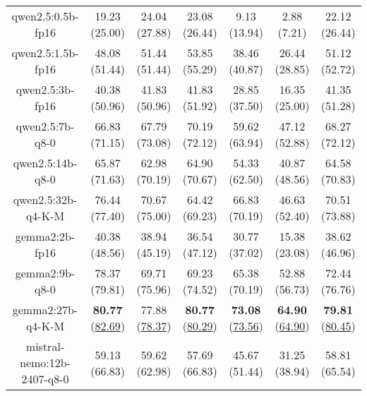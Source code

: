 \begin{table}[hbp]
{\begin{tabular}{ccccccc}
      \multicolumn{1}{c|}{qwen2.5:0.5b-fp16} & 19.23 (25.00) & 24.04 (27.88) & \multicolumn{1}{c|}{23.08 (26.44)} & 9.13 (13.94) & \multicolumn{1}{c|}{2.88 (7.21)} & 22.12 (26.44) \\

      \multicolumn{1}{c|}{qwen2.5:1.5b-fp16} & 48.08 (51.44) & 51.44 (51.44) & \multicolumn{1}{c|}{53.85 (55.29)} & 38.46 (40.87) & \multicolumn{1}{c|}{26.44 (28.85)} & 51.12 (52.72) \\

      \multicolumn{1}{c|}{qwen2.5:3b-fp16} & 40.38 (50.96) & 41.83 (50.96) & \multicolumn{1}{c|}{41.83 (51.92)} & 28.85 (37.50) & \multicolumn{1}{c|}{16.35 (25.00)} & 41.35 (51.28) \\

      \multicolumn{1}{c|}{qwen2.5:7b-q8-0} & 66.83 (71.15) & 67.79 (73.08) & \multicolumn{1}{c|}{70.19 (72.12)} & 59.62 (63.94) & \multicolumn{1}{c|}{47.12 (52.88)} & 68.27 (72.12) \\

      \multicolumn{1}{c|}{qwen2.5:14b-q8-0} & 65.87 (71.63) & 62.98 (70.19) & \multicolumn{1}{c|}{64.90 (70.67)} & 54.33 (62.50) & \multicolumn{1}{c|}{40.87 (48.56)} & 64.58 (70.83) \\

      \multicolumn{1}{c|}{qwen2.5:32b-q4-K-M} & 76.44 (77.40) & 70.67 (75.00) & \multicolumn{1}{c|}{64.42 (69.23)} & 66.83 (70.19) & \multicolumn{1}{c|}{46.63 (52.40)} & 70.51 (73.88) \\

      \multicolumn{1}{c|}{gemma2:2b-fp16} & 40.38 (48.56) & 38.94 (45.19) & \multicolumn{1}{c|}{36.54 (47.12)} & 30.77 (37.02) & \multicolumn{1}{c|}{15.38 (23.08)} & 38.62 (46.96) \\

      \multicolumn{1}{c|}{gemma2:9b-q8-0} & 78.37 (79.81) & 69.71 (75.96) & \multicolumn{1}{c|}{69.23 (74.52)} & 65.38 (70.19) & \multicolumn{1}{c|}{52.88 (56.73)} & 72.44 (76.76) \\

      \multicolumn{1}{c|}{gemma2:27b-q4-K-M} & \textbf{80.77} (\underline{82.69}) & 77.88 (\underline{78.37}) & \multicolumn{1}{c|}{\textbf{80.77} (\underline{80.29})} & \textbf{73.08} (\underline{73.56}) & \multicolumn{1}{c|}{\textbf{64.90} (\underline{64.90})} & \textbf{79.81} (\underline{80.45}) \\

      \multicolumn{1}{c|}{mistral-nemo:12b-2407-q8-0} & 59.13 (66.83) & 59.62 (62.98) & \multicolumn{1}{c|}{57.69 (66.83)} & 45.67 (51.44) & \multicolumn{1}{c|}{31.25 (38.94)} & 58.81 (65.54) \\


\end{tabular}}
\end{table}
